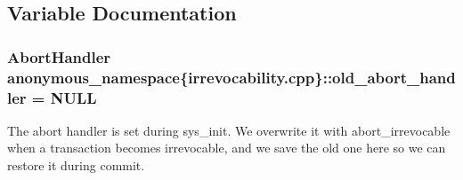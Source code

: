 \subsection{Variable Documentation}
\hypertarget{namespaceanonymous__namespace_02irrevocability_8cpp_03_ac93d4712c00e7ccb77270953062faa28}{
\subsubsection[{old\-\_\-abort\-\_\-handler}]{\setlength{\rightskip}{0pt plus 5cm}Abort\-Handler anonymous\-\_\-namespace\{irrevocability.\-cpp\}\-::old\-\_\-abort\-\_\-handler = N\-U\-L\-L}}\label{namespaceanonymous__namespace_02irrevocability_8cpp_03_ac93d4712c00e7ccb77270953062faa28}
The abort handler is set during sys\-\_\-init. We overwrite it with abort\-\_\-irrevocable when a transaction becomes irrevocable, and we save the old one here so we can restore it during commit. 